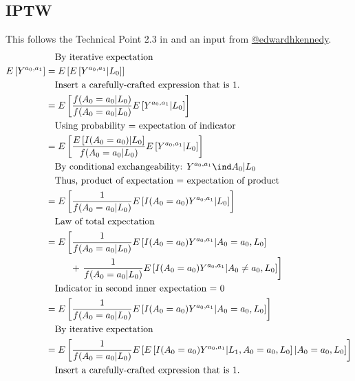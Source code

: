 \documentclass[dvipdfmx,10pt]{article}
\begin{document}
\subsection{IPTW}
\label{sec:org81dc8ba}
This follows the Technical Point 2.3 in \cite{hernanCausalInference2019} and an input from \href{https://twitter.com/edwardhkennedy/status/1119305663564472320}{@edwardhkennedy}.
\begin{align*}
  &~~~\text{By iterative expectation}\\
  E\left[Y^{a_{0},a_{1}}\right]
  &= E\left[E\left[Y^{a_{0},a_{1}} | L_{0}\right]\right]\\
  &~~~\text{Insert a carefully-crafted expression that is 1.}\\
  &= E\left[\frac{f(A_{0}=a_{0} | L_{0})}{f(A_{0}=a_{0} | L_{0})} E\left[Y^{a_{0},a_{1}} | L_{0}\right]\right]\\
  &~~~\text{Using probability = expectation of indicator}\\
  &= E\left[\frac{E \left[ I(A_{0}=a_{0}) | L_{0} \right]}{f(A_{0}=a_{0} | L_{0})} E\left[Y^{a_{0},a_{1}} | L_{0}\right]\right]\\
  &~~~\text{By conditional exchangeability: } Y^{a_{0},a_{1}} \ind A_{0} | L_{0}\\
  &~~~\text{Thus, product of expectation = expectation of product}\\
  &= E\left[\frac{1}{f(A_{0}=a_{0} | L_{0})} E\left[I(A_{0}=a_{0})Y^{a_{0},a_{1}} | L_{0}\right]\right]\\
  &~~~\text{Law of total expectation}\\
  &= E\left[
    \frac{1}{f(A_{0}=a_{0} | L_{0})} E\left[I(A_{0}=a_{0})Y^{a_{0},a_{1}} | A_{0}=a_{0}, L_{0}\right]
    \right.\\
  &~~~~~~~~+\left.
    \frac{1}{f(A_{0}=a_{0} | L_{0})} E\left[I(A_{0}=a_{0})Y^{a_{0},a_{1}} | A_{0}\ne a_{0}, L_{0}\right]
    \right]\\
  &~~~\text{Indicator in second inner expectation = 0}\\
  &= E\left[\frac{1}{f(A_{0}=a_{0} | L_{0})} E\left[I(A_{0}=a_{0})Y^{a_{0},a_{1}} | A_{0} = a_{0}, L_{0}\right]\right]\\
  &~~~\text{By iterative expectation}\\
  &= E\left[\frac{1}{f(A_{0}=a_{0} | L_{0})} E\left[E\left[I(A_{0}=a_{0})Y^{a_{0},a_{1}} |L_{1}, A_{0} = a_{0}, L_{0}\right] | A_{0} = a_{0}, L_{0}\right]\right]\\
  &~~~\text{Insert a carefully-crafted expression that is 1.}\\

\end{align*}
\end{document}
